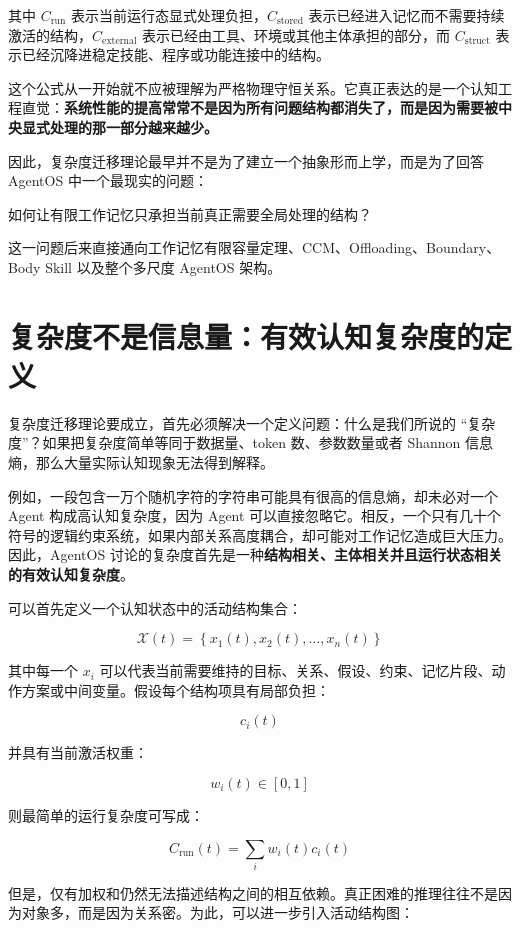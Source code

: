 其中 $C_{\mathrm{run}}$ 表示当前运行态显式处理负担，$C_{\mathrm{stored}}$ 表示已经进入记忆而不需要持续激活的结构，$C_{\mathrm{external}}$ 表示已经由工具、环境或其他主体承担的部分，而 $C_{\mathrm{struct}}$ 表示已经沉降进稳定技能、程序或功能连接中的结构。

这个公式从一开始就不应被理解为严格物理守恒关系。它真正表达的是一个认知工程直觉：\textbf{系统性能的提高常常不是因为所有问题结构都消失了，而是因为需要被中央显式处理的那一部分越来越少。}

因此，复杂度迁移理论最早并不是为了建立一个抽象形而上学，而是为了回答 AgentOS 中一个最现实的问题：

\begin{statementbox}
如何让有限工作记忆只承担当前真正需要全局处理的结构？
\end{statementbox}

这一问题后来直接通向工作记忆有限容量定理、CCM、Offloading、Boundary、Body Skill 以及整个多尺度 AgentOS 架构。

\section{复杂度不是信息量：有效认知复杂度的定义}
\label{sec:effective-cognitive-complexity}

复杂度迁移理论要成立，首先必须解决一个定义问题：什么是我们所说的 ``复杂度''？如果把复杂度简单等同于数据量、token 数、参数数量或者 Shannon 信息熵，那么大量实际认知现象无法得到解释。

例如，一段包含一万个随机字符的字符串可能具有很高的信息熵，却未必对一个 Agent 构成高认知复杂度，因为 Agent 可以直接忽略它。相反，一个只有几十个符号的逻辑约束系统，如果内部关系高度耦合，却可能对工作记忆造成巨大压力。因此，AgentOS 讨论的复杂度首先是一种\textbf{结构相关、主体相关并且运行状态相关的有效认知复杂度}。

可以首先定义一个认知状态中的活动结构集合：

\[
\mathcal{X}(t)
=
\left\{
x_1(t),x_2(t),\ldots,x_n(t)
\right\}
\]

其中每一个 $x_i$ 可以代表当前需要维持的目标、关系、假设、约束、记忆片段、动作方案或中间变量。假设每个结构项具有局部负担：

\[
c_i(t)
\]

并具有当前激活权重：

\[
w_i(t)\in[0,1]
\]

则最简单的运行复杂度可写成：

\[
C_{\mathrm{run}}(t)
=
\sum_i w_i(t)c_i(t)
\]

但是，仅有加权和仍然无法描述结构之间的相互依赖。真正困难的推理往往不是因为对象多，而是因为关系密。为此，可以进一步引入活动结构图：


